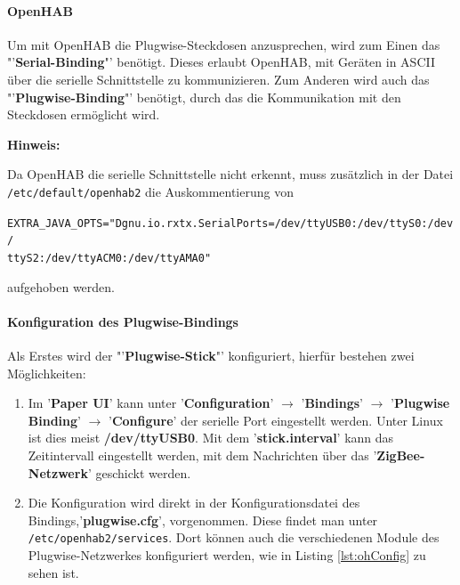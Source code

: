 \newpage

\paragraph{OpenHAB}

Um mit OpenHAB die Plugwise-Steckdosen anzusprechen, wird zum Einen das "'\textbf{Serial-Binding}"' benötigt. Dieses erlaubt OpenHAB, mit Geräten in ASCII über die serielle Schnittstelle zu kommunizieren. Zum Anderen wird auch das "'\textbf{Plugwise-Binding}"' benötigt, durch das die Kommunikation mit den Steckdosen ermöglicht wird.\newline

\textbf{Hinweis: }

Da OpenHAB die serielle Schnittstelle nicht erkennt, muss zusätzlich in der Datei \newline \texttt{/etc/default/openhab2} die Auskommentierung von 

\texttt{EXTRA\_JAVA\_OPTS="Dgnu.io.rxtx.SerialPorts=/dev/ttyUSB0:/dev/ttyS0:/dev/\\ttyS2:/dev/ttyACM0:/dev/ttyAMA0"}

aufgehoben werden.

\newpage

\paragraph{Konfiguration des Plugwise-Bindings}

Als Erstes wird der "'\textbf{Plugwise-Stick}"' konfiguriert, hierfür bestehen zwei Möglichkeiten:
\begin{enumerate}
	\item Im '\textbf{Paper UI}' kann unter '\textbf{Configuration}' $\rightarrow$  '\textbf{Bindings}' $\rightarrow$  '\textbf{Plugwise Binding}' $\rightarrow$  '\textbf{Configure}' der serielle Port eingestellt werden. Unter Linux ist dies meist \textbf{/dev/ttyUSB0}. \newline
	Mit dem '\textbf{stick.interval}' kann das Zeitintervall eingestellt werden, mit dem Nachrichten über das '\textbf{ZigBee-Netzwerk}' geschickt werden.
	\item Die Konfiguration wird direkt in der Konfigurationsdatei des Bindings,'\textbf{plugwise.cfg}', vorgenommen. Diese findet man unter \texttt{/etc/openhab2/services}. Dort können auch die verschiedenen Module des Plugwise-Netzwerkes konfiguriert werden, wie in Listing \ref{lst:ohConfig} zu sehen ist.\newline
	
	
	
	
\end{enumerate}

